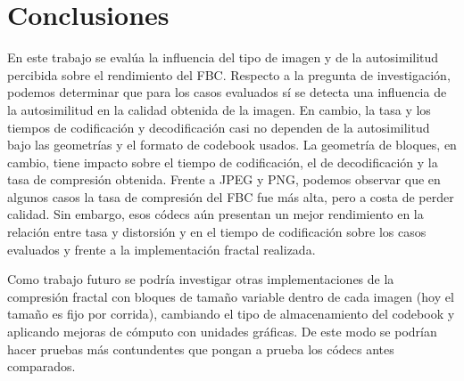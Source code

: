 
\section{Conclusiones}
\label{sec:conclusiones}

En este trabajo se evalúa la influencia del tipo de imagen y de la autosimilitud percibida sobre el rendimiento del FBC. Respecto a la pregunta de investigación, podemos determinar que para los casos evaluados sí se detecta una influencia de la autosimilitud en la calidad obtenida de la imagen. En cambio, la tasa y los tiempos de codificación y decodificación casi no dependen de la autosimilitud bajo las geometrías y el formato de codebook usados. La geometría de bloques, en cambio, tiene impacto sobre el tiempo de codificación, el de decodificación y la tasa de compresión obtenida. Frente a JPEG y PNG, podemos observar que en algunos casos la tasa de compresión del FBC fue más alta, pero a costa de perder calidad. Sin embargo, esos códecs aún presentan un mejor rendimiento en la relación entre tasa y distorsión y en el tiempo de codificación sobre los casos evaluados y frente a la implementación fractal realizada.

Como trabajo futuro se podría investigar otras implementaciones de la compresión fractal con bloques de tamaño variable dentro de cada imagen (hoy el tamaño es fijo por corrida), cambiando el tipo de almacenamiento del codebook y aplicando mejoras de cómputo con unidades gráficas. De este modo se podrían hacer pruebas más contundentes que pongan a prueba los códecs antes comparados.
